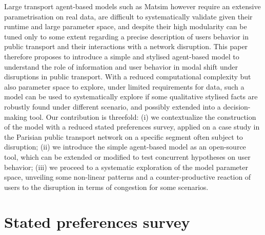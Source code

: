\documentclass[3p,times,procedia]{elsarticle}
\begin{document}
Large transport agent-based models such as Matsim however require an extensive parametrisation on real data, are difficult to systematically validate given their runtime and large parameter space, and despite their high modularity can be tuned only to some extent regarding a precise description of users behavior in public transport and their interactions with a network disruption. This paper therefore proposes to introduce a simple and stylised agent-based model to understand the role of information and user behavior in modal shift under disruptions in public transport. With a reduced computational complexity but also parameter space to explore, under limited requirements for data, such a model can be used to systematically explore if some qualitative stylised facts are robustly found under different scenario, and possibly extended into a decision-making tool. Our contribution is threefold: (i) we contextualize the construction of the model with a reduced stated preferences survey, applied on a case study in the Parisian public transport network on a specific segment often subject to disruption; (ii) we introduce the simple agent-based model as an open-source tool, which can be extended or modified to test concurrent hypotheses on user behavior; (iii) we proceed to a systematic exploration of the model parameter space, unveiling some non-linear patterns and a counter-productive reaction of users to the disruption in terms of congestion for some scenarios.


\section{Stated preferences survey}

\end{document}
